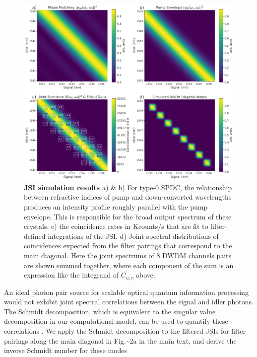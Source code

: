 \documentclass[11pt]{caltech_thesis} %
\begin{document}
\hypertarget{fig:jsi_sim}{%
\begin{figure}
\centering
\includegraphics[width=1\textwidth,height=\textheight]{./chapter_05/figs/JSI_sim_results_light.pdf}
\caption[{JSI simulation results}]{\textbf{JSI simulation results} a) \& b) For type-0 SPDC, the relationship between refractive indices of pump and down-converted wavelengths produces an intensity profile roughly parallel with the pump envelope. This is responsible for the broad output spectrum of these crystals. c) the coincidence rates in Kcounts/s that are fit to filter-defined integrations of the JSI. d) Joint spectral distributions of coincidences expected from the filter pairings that correspond to the main diagonal. Here the joint spectrums of 8 DWDM channels pairs are shown summed together, where each component of the sum is an expression like the integrand of $C_{u,v}$ above.}
\label{fig:jsi_sim}
\end{figure}
}

An ideal photon pair source for scalable optical quantum information processing would not exhibit joint spectral correlations between the signal and idler photons. The Schmidt decomposition, which is equivalent to the singular value decomposition in our computational model, can be used to quantify these correlations \autocite{ZielnickiKwiat2018SPDCmodel}. We apply the Schmidt decomposition to the filtered JSIs for filter pairings along the main diagonal in Fig.\textasciitilde2a in the main text, and derive the inverse Schmidt number for these modes
\end{document}
